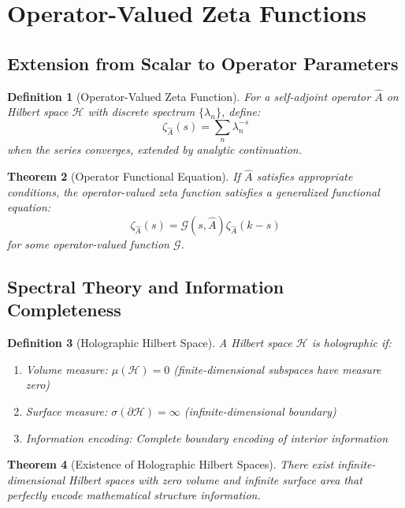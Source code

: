 \documentclass[12pt]{article}
\newtheorem{theorem}{Theorem}[section]
\newtheorem{definition}[theorem]{Definition}
\begin{document}
\section{Operator-Valued Zeta Functions}

\subsection{Extension from Scalar to Operator Parameters}

\begin{definition}[Operator-Valued Zeta Function]
For a self-adjoint operator $\hat{A}$ on Hilbert space $\mathcal{H}$ with discrete spectrum $\{\lambda_n\}$, define:
$$\zeta_{\hat{A}}(s) = \sum_{n} \lambda_n^{-s}$$
when the series converges, extended by analytic continuation.
\end{definition}

\begin{theorem}[Operator Functional Equation]
If $\hat{A}$ satisfies appropriate conditions, the operator-valued zeta function satisfies a generalized functional equation:
$$\zeta_{\hat{A}}(s) = \mathcal{G}(s, \hat{A}) \zeta_{\hat{A}}(k-s)$$
for some operator-valued function $\mathcal{G}$.
\end{theorem}

\subsection{Spectral Theory and Information Completeness}

\begin{definition}[Holographic Hilbert Space]
A Hilbert space $\mathcal{H}$ is holographic if:
\begin{enumerate}
\item Volume measure: $\mu(\mathcal{H}) = 0$ (finite-dimensional subspaces have measure zero)
\item Surface measure: $\sigma(\partial\mathcal{H}) = \infty$ (infinite-dimensional boundary)
\item Information encoding: Complete boundary encoding of interior information
\end{enumerate}
\end{definition}

\begin{theorem}[Existence of Holographic Hilbert Spaces]
There exist infinite-dimensional Hilbert spaces with zero volume and infinite surface area that perfectly encode mathematical structure information.
\end{theorem}
\end{document}
